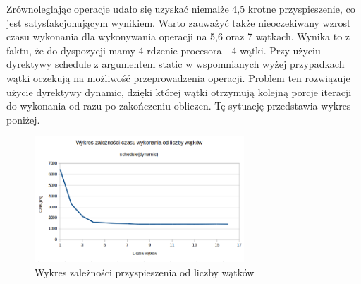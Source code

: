\documentclass[a4paper,12pt]{article}
\begin{document}
Zrównoleglając operacje udało się uzyskać niemalże 4,5 krotne przyspieszenie, co jest satysfakcjonującym wynikiem. Warto zauważyć także nieoczekiwany wzrost czasu wykonania dla wykonywania operacji na 5,6 oraz 7 wątkach. Wynika to z faktu, że do dyspozycji mamy 4 rdzenie procesora - 4 wątki. Przy użyciu dyrektywy schedule z argumentem static w wspomnianych wyżej przypadkach wątki oczekują na możliwość przeprowadzenia operacji. Problem ten rozwiązuje użycie dyrektywy dynamic, dzięki której wątki otrzymują kolejną porcje iteracji do wykonania od razu po zakończeniu obliczen. Tę sytuację przedstawia wykres poniżej.

\begin{figure}[ht]
	\centering
  \includegraphics[width=0.7\textwidth]{./dane/wykres1_d.png}
  \caption{Wykres zależności przyspieszenia od liczby wątków}
\end{figure}
\end{document}
